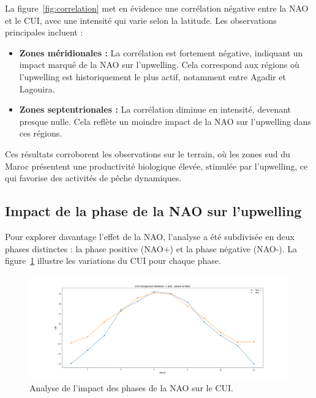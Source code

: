 La figure~\ref{fig:correlation} met en évidence une corrélation négative entre la NAO et le CUI, avec une intensité qui varie selon la latitude. Les observations principales incluent :
\begin{itemize}
    \item \textbf{Zones méridionales :} La corrélation est fortement négative, indiquant un impact marqué de la NAO sur l'upwelling. Cela correspond aux régions où l’upwelling est historiquement le plus actif, notamment entre Agadir et Lagouira.
    \item \textbf{Zones septentrionales :} La corrélation diminue en intensité, devenant presque nulle. Cela reflète un moindre impact de la NAO sur l’upwelling dans ces régions.
\end{itemize}

Ces résultats corroborent les observations sur le terrain, où les zones sud du Maroc présentent une productivité biologique élevée, stimulée par l'upwelling, ce qui favorise des activités de pêche dynamiques.

\subsection{Impact de la phase de la NAO sur l'upwelling}
Pour explorer davantage l’effet de la NAO, l’analyse a été subdivisée en deux phases distinctes : la phase positive (NAO+) et la phase négative (NAO-). La figure~\ref{fig:impact_phases} illustre les variations du CUI pour chaque phase.

\begin{figure}[H]
\centering
\includegraphics[scale=0.3]{CUI_NAO_PHASES.png}
\caption{Analyse de l'impact des phases de la NAO sur le CUI.}
\label{fig:impact_phases}
\end{figure}

